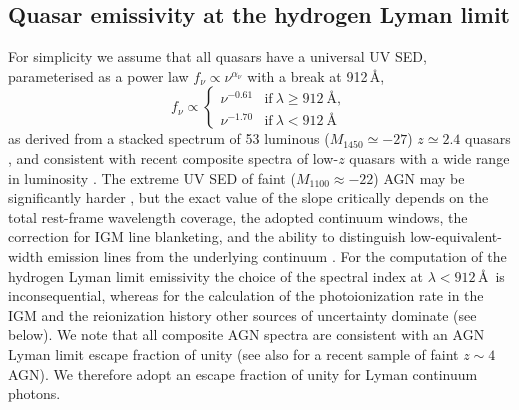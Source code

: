 \documentclass[fleqn,usenatbib]{mnras}
\begin{document}
\subsection{Quasar emissivity at the hydrogen Lyman limit}
\label{sec:e912}

For simplicity we assume that all quasars have a universal UV SED,
parameterised as a power law $f_\nu\propto\nu^{\alpha_\nu}$
with a break at 912\,\AA,
\begin{equation}
  f_\nu\propto\begin{cases}
  \nu^{-0.61} & \text{if}~\lambda\ge 912~\text{\AA},\\
  \nu^{-1.70} & \text{if}~\lambda<912~\text{\AA}                
  \end{cases}
  \label{eqn:sed}
\end{equation}
as derived from a stacked spectrum of 53 luminous ($M_{1450}\simeq
-27$) $z\simeq 2.4$ quasars \citep{2015MNRAS.449.4204L}, and
consistent with recent composite spectra of low-$z$ quasars with a
wide range in luminosity \citep{2012ApJ...752..162S,
  2014ApJ...794...75S}.  The extreme UV SED of faint ($M_{1100}\approx
-22$) AGN may be significantly harder
\citep[$\alpha_\nu=-0.56$,][]{2004ApJ...615..135S}, but the exact
value of the slope critically depends on the total rest-frame
wavelength coverage, the adopted continuum windows, the correction for
IGM line blanketing, and the ability to distinguish
low-equivalent-width emission lines from the underlying continuum
\citep{2014ApJ...794...75S,2015MNRAS.449.4204L,2016ApJ...817...56T}.
For the computation of the hydrogen Lyman limit emissivity the choice
of the spectral index at $\lambda<912$\,\AA\ is inconsequential,
whereas for the calculation of the  photoionization rate in
the IGM and the  reionization history other sources of
uncertainty dominate (see below).  We note that all composite AGN
spectra are consistent with an AGN Lyman limit escape fraction of
unity (see also \citealt{2018A&A...613A..44G} for a recent sample of
faint $z\sim 4$ AGN).  We therefore adopt an escape fraction of unity
for Lyman continuum photons.
\end{document}
